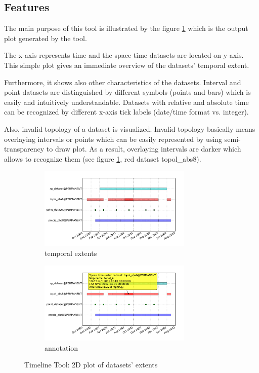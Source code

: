 \documentclass[a4paper,12pt,oneside]{book}
\begin{document}
\subsection{Features}
The main purpose of this tool is illustrated by the figure \ref{fig:timeline1}
which is the output plot generated by the tool.

The x-axis represents time and the space time datasets are located on y-axis.
This simple plot gives an immediate overview of the datasets' temporal extent.

Furthermore, it shows also other characteristics of the datasets.
Interval and point datasets are distinguished by different symbols (points and bars)
which is easily and intuitively understandable.
Datasets with relative and absolute time can be recognized by different x-axis tick labels (date/time format vs. integer).

Also, invalid topology of a dataset is visualized.
Invalid topology basically means overlaying intervals or points
which can be easily represented by using semi-transparency to draw plot.
As a result, overlaying intervals are darker
which allows to recognize them (see figure \ref{fig:timeline1}, red dataset topol\_abs8).

\begin{figure}[ht!]
  \centering
  \begin{subfigure}[ht]{\textwidth}
  \centering
  \includegraphics[width=0.8\textwidth]{./images/timeline1.pdf}
  \caption{temporal extents}
  \label{fig:timeline1}
  \end{subfigure}

  \begin{subfigure}[ht]{\textwidth}
  \centering
  \includegraphics[width=0.8\textwidth]{./images/timeline3.pdf}
  \caption{annotation}
  \label{fig:timeline3}
  \end{subfigure}
%   
\caption{Timeline Tool: 2D plot of datasets' extents}
\label{fig:timeline}
\end{figure}
\end{document}
